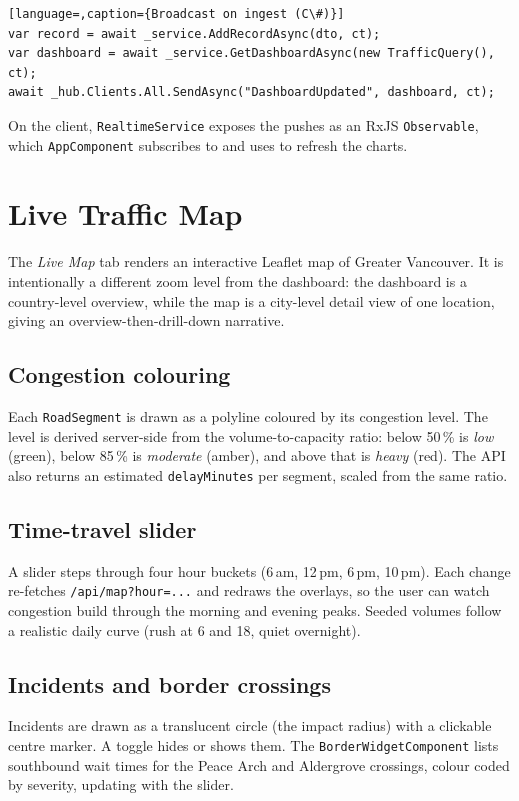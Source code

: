 \documentclass[11pt,a4paper]{article}
\newcommand{\code}[1]{\texttt{\small #1}}
\begin{document}
\begin{lstlisting}[language=,caption={Broadcast on ingest (C\#)}]
var record = await _service.AddRecordAsync(dto, ct);
var dashboard = await _service.GetDashboardAsync(new TrafficQuery(), ct);
await _hub.Clients.All.SendAsync("DashboardUpdated", dashboard, ct);
\end{lstlisting}

\noindent On the client, \code{RealtimeService} exposes the pushes as an RxJS
\code{Observable}, which \code{AppComponent} subscribes to and uses to refresh
the charts.

\section{Live Traffic Map}
The \emph{Live Map} tab renders an interactive Leaflet map of Greater Vancouver.
It is intentionally a different zoom level from the dashboard: the dashboard is a
country-level overview, while the map is a city-level detail view of one
location, giving an overview-then-drill-down narrative.

\subsection{Congestion colouring}
Each \code{RoadSegment} is drawn as a polyline coloured by its congestion level.
The level is derived server-side from the volume-to-capacity ratio: below 50\,\%
is \emph{low} (green), below 85\,\% is \emph{moderate} (amber), and above that is
\emph{heavy} (red). The API also returns an estimated \code{delayMinutes} per
segment, scaled from the same ratio.

\subsection{Time-travel slider}
A slider steps through four hour buckets (6\,am, 12\,pm, 6\,pm, 10\,pm). Each
change re-fetches \code{/api/map?hour=...} and redraws the overlays, so the user
can watch congestion build through the morning and evening peaks. Seeded volumes
follow a realistic daily curve (rush at 6 and 18, quiet overnight).

\subsection{Incidents and border crossings}
Incidents are drawn as a translucent circle (the impact radius) with a clickable
centre marker. A toggle hides or shows them. The \code{BorderWidgetComponent}
lists southbound wait times for the Peace Arch and Aldergrove crossings, colour
coded by severity, updating with the slider.
\end{document}
